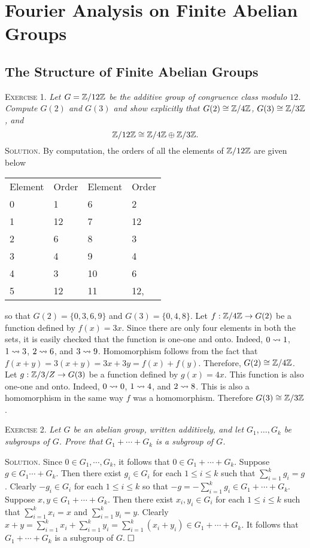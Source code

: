 \documentclass[11pt, leqno]{article}
\newcommand{\done}{\ensuremath{\hfill\square}}
\begin{document}
\section{Fourier Analysis on Finite Abelian Groups}

\subsection{The Structure of Finite Abelian Groups}

\textsc{Exercise 1}. \emph{Let $G = \mathbb{Z}/12\mathbb{Z}$ be the additive group of congruence class modulo $12$. Compute $G(2)$ and $G(3)$ and show explicitly that $G(2) \cong \mathbb{Z}/4\mathbb{Z}$, $G(3) \cong \mathbb{Z}/3\mathbb{Z}$, and 
\begin{displaymath}
\mathbb{Z}/12\mathbb{Z} \cong \mathbb{Z}/4\mathbb{Z} \oplus \mathbb{Z}/3\mathbb{Z}.
\end{displaymath} }\textsc{Solution}. By computation, the orders of all the elements of $\mathbb{Z}/12\mathbb{Z}$ are given below
\begin{longtable}{p{4em} p{4em} p{4em} p{4em}}
  Element & Order & Element & Order \\
  0 & 1 & 6 & 2 \\
  1 & 12 & 7 & 12 \\
  2 & 6 & 8 & 3 \\
  3 & 4 & 9 & 4 \\
  4 & 3 & 10 & 6 \\
  5 & 12 & 11 & 12,
\end{longtable}\reduce
so that $G(2) = \{0, 3, 6, 9\}$ and $G(3) = \{0, 4, 8\}$. Let $f : \mathbb{Z}/4\mathbb{Z} \to G(2)$ be a function defined by $f(x) = 3x$. Since there are only four elements in both the sets, it is easily checked that the function is one-one and onto. Indeed, $0 \rightsquigarrow 1$, $1 \rightsquigarrow 3$, $2 \rightsquigarrow 6$, and $3 \rightsquigarrow 9$. Homomorphism follows from the fact that $f(x+y) = 3(x+y) = 3x + 3y = f(x) + f(y)$. Therefore, $G(2) \cong \mathbb{Z}/4\mathbb{Z}$. Let $g : \mathbb{Z}/3/Z \to G(3)$ be a function defined by $g(x) = 4x$. This function is also one-one and onto. Indeed, $0 \rightsquigarrow 0$, $1 \rightsquigarrow 4$, and $2 \rightsquigarrow 8$. This is also a homomorphism in the same way $f$ was a homomorphism. Therefore $G(3) \cong \mathbb{Z}/3\mathbb{Z}$.

\textsc{Exercise 2}. \emph{Let $G$ be an abelian group, written additively, and let $G_1, \ldots, G_k$ be subgroups of $G$. Prove that $G_1 + \cdots + G_k$ is a subgroup of $G$.}

\textsc{Solution}. Since $0 \in G_1, \cdots, G_k$, it follows that $0 \in G_1 + \cdots + G_k$. Suppose $g \in G_1 \cdots + G_k$. Then there exist $g_i \in G_i$ for each $1 \leq i \leq k$ such that $\sum_{i=1}^k g_i = g$. Clearly $-g_i \in G_i$ for each $1 \leq i \leq k$ so that $-g = -\sum_{i=1}^k g_i \in G_1 + \cdots + G_k$. Suppose $x, y \in G_1 + \cdots + G_k$. Then there exist $x_i, y_i \in G_i$ for each $1 \leq i \leq k$ such that $\sum_{i=1}^k x_i = x$ and $\sum_{i=1}^k y_i = y$. Clearly $x + y = \sum_{i=1}^k x_i + \sum_{i=1}^k y_i = \sum_{i=1}^k (x_i + y_i) \in G_1 + \cdots + G_k$. It follows that $G_1 + \cdots + G_k$ is a subgroup of $G$. \done
\end{document}
